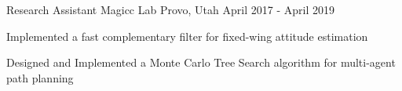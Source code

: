 \begin{cventries}
  \cventry
    {Research Assistant} %
    {Magicc Lab} %
    {Provo, Utah} %
    {April 2017 - April 2019} %
    {
      \begin{cvitems} %
      \item{Implemented a fast complementary filter for fixed-wing attitude estimation}
      \item{Designed and Implemented a Monte Carlo Tree Search algorithm for multi-agent path planning}
      \end{cvitems}
    }



\end{cventries}
